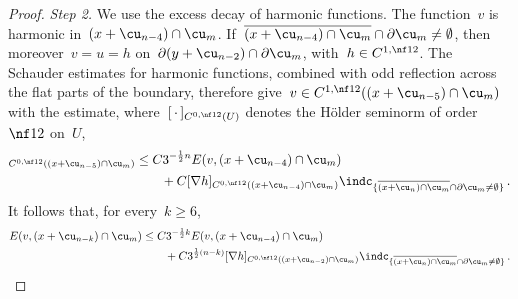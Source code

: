 \documentclass[11pt]{amsart}
\begin{document}
\begin{proof}
\emph{Step 2.} We use the excess decay of harmonic functions. The function~$v$ is harmonic in~$(x+\cu_{n-4})\cap\cu_m$. If~$\overline{(x+\cu_{n-4})\cap\cu_m} \cap \partial \cu_m \neq \emptyset$, then moreover~$v = u = h$ on~$\partial (y+\cu_{n-2}) \cap \partial \cu_m$, with~$h \in C^{1,\nf12}$. The Schauder estimates for harmonic functions, combined with odd reflection across the flat parts of the boundary, therefore give~$v \in C^{1,\nf12}((x+\cu_{n-5})\cap\cu_m)$ with the estimate, where~$[\,\cdot\,]_{C^{0,\nf12}(U)}$ denotes the H\"older seminorm of order~$\nf12$ on~$U$,
\begin{align*}
	[\nabla v]_{C^{0,\nf12}((x+\cu_{n-5})\cap\cu_m)}
	&\leq
	C 3^{-\frac{1}{2} n} E(v,(x+\cu_{n-4})\cap\cu_m)
	\notag \\ & \qquad
	+ C[\nabla h]_{C^{0,\nf12}((x+\cu_{n-4})\cap\cu_m)} \indc_{\{ \overline{(x+\cu_{n})\cap\cu_m} \cap \partial \cu_m \neq \emptyset\}}
	\,.
\end{align*}
It follows that, for every~$k \geq 6$,
\begin{align*}
	E(v,(x+\cu_{n-k})\cap\cu_m)
	&\leq
	C 3^{-\frac{1}{2} k} E(v,(x+\cu_{n-4})\cap\cu_m)
	\notag \\ & \qquad
	+ C 3^{\frac{1}{2}(n-k)} [\nabla h]_{C^{0,\nf12}((x+\cu_{n-2})\cap\cu_m)} \indc_{\{ \overline{(x+\cu_{n})\cap\cu_m} \cap \partial \cu_m \neq \emptyset\}}
	\,.
\end{align*}

\smallskip


\end{proof}
\end{document}
